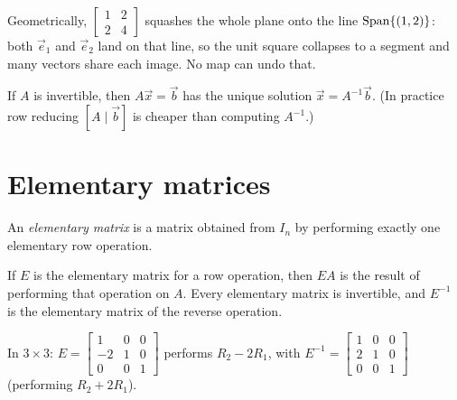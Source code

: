 Geometrically, $\begin{bmatrix}1&2\\2&4\end{bmatrix}$ squashes the whole plane onto the line
$\operatorname{Span}\{(1,2)\}$: both $\vec e_1$ and $\vec e_2$ land on that line, so the unit square collapses to a
segment and many vectors share each image. No map can undo that.
\begin{center}
\end{center}

If $A$ is invertible, then $A\vec x=\vec b$ has the unique solution $\vec x=A^{-1}\vec b$. (In practice
row reducing $[A\mid\vec b]$ is cheaper than computing $A^{-1}$.)

\section{Elementary matrices}

\begin{definition}
An \emph{elementary matrix} is a matrix obtained from $I_n$ by performing exactly one elementary row
operation.
\end{definition}

\begin{theorem}
If $E$ is the elementary matrix for a row operation, then $EA$ is the result of performing that
operation on $A$. Every elementary matrix is invertible, and $E^{-1}$ is the elementary matrix of the
reverse operation.
\end{theorem}

\begin{example}
In $3\times 3$: $E=\begin{bmatrix}1&0&0\\-2&1&0\\0&0&1\end{bmatrix}$ performs $R_2-2R_1$, with
$E^{-1}=\begin{bmatrix}1&0&0\\2&1&0\\0&0&1\end{bmatrix}$ (performing $R_2+2R_1$).
\end{example}

